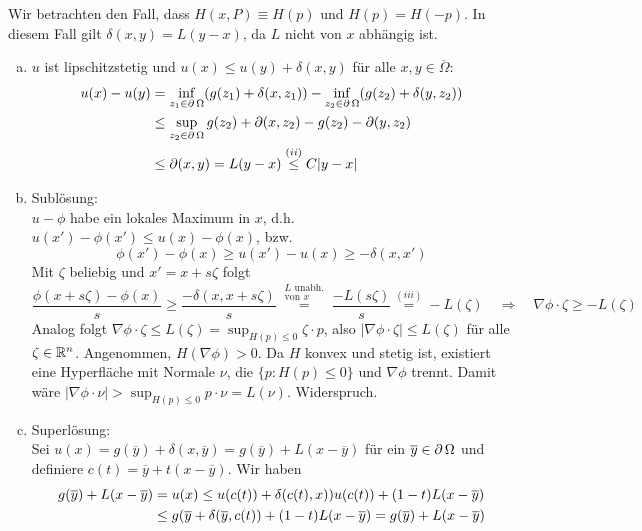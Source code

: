 	Wir betrachten den Fall, dass $H(x,P) \equiv H(p)$ und $H(p) = H(-p)$. In diesem Fall gilt $\delta(x,y) = L(y-x)$, da $L$ nicht von $x$ abhängig ist. \begin{enumerate}[a)]
		\item $u$ ist lipschitzstetig und $u(x) \leq u(y) + \delta(x,y)$ für alle $x,y \in \overline{\Omega}$:
		\begin{equation}
		\begin{aligned}
			u(x) - u(y) &= \inf_{z_1 \in \operatorname{\partial}\Omega} (g(z_1) + \delta(x,z_1)) - \inf_{z_2 \in \operatorname{\partial} \Omega} (g(z_2) + \delta(y,z_2)) \\ \notag
			&\leq \sup_{z_2 \in \operatorname{\partial} \Omega} g(z_2) + \operatorname{\partial}(x,z_2) - g(z_2) - \operatorname{\partial}(y,z_2) \\
			&\leq \operatorname{\partial}(x,y) = L(y-x) \overset{(ii)}{\leq} C|y-x|
		\end{aligned}
		\end{equation}
		\item Sublösung: \\
		$u-\phi$ habe ein lokales Maximum in $x$, d.h. $u(x')-\phi(x') \leq u(x) - \phi(x)$, bzw.
		\[ \phi(x') - \phi(x) \geq u(x') - u(x) \geq -\delta(x,x') \]
		Mit $\zeta$ beliebig und $x' = x + s \zeta$ folgt
		\[ \frac{\phi(x+s\zeta)-\phi(x)}{s} \geq \frac{-\delta(x,x+s\zeta)}{s} \overset{\substack{L \text{ unabh.} \\ \text{von } x}}{=} \frac{-L(s\zeta)}{s} \overset{(iii)}{=} -L(\zeta) \quad \Rightarrow \quad \nabla \phi \cdot \zeta \geq -L(\zeta) \]
		Analog folgt $\nabla \phi \cdot \zeta \leq L(\zeta) = \sup_{H(p) \leq 0} \zeta \cdot p$, also $|\nabla \phi \cdot \zeta| \leq L(\zeta)$ für alle $\zeta \in \mathbb{R}^n$. Angenommen, $H(\nabla \phi) > 0$. Da $H$ konvex und stetig ist, existiert eine Hyperfläche mit Normale $\nu$, die $\{p : H(p) \leq 0\}$ und $\nabla \phi$ trennt. Damit wäre $|\nabla \phi \cdot \nu| > \sup_{H(p) \leq 0} p \cdot \nu = L(\nu)$. Widerspruch.
		\item Superlösung: \\
		Sei $u(x) = g(\overline{y}) + \delta(x,\overline{y}) = g(\overline{y}) + L(x-\overline{y})$ für ein $\overline{y} \in \operatorname{\partial} \Omega$ und definiere $c(t) = \overline{y} + t(x-\overline{y})$. Wir haben
		\begin{equation}
		\begin{aligned}
			g(\overline{y}) + L(x-\overline{y}) &= u(x) \leq u(c(t)) + \delta(c(t),x) ) u(c(t)) + (1-t)L(x-\overline{y}) \\ \notag
			&\leq g(\overline{y} + \delta(\overline{y},c(t)) + (1-t)L(x-\overline{y}) = g(\overline{y}) + L(x-\overline{y})

\end{aligned}
\end{equation}
\end{enumerate}
